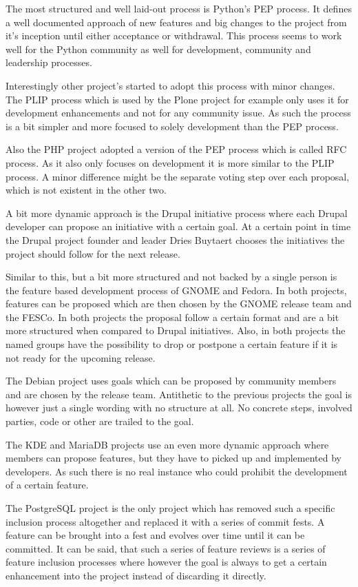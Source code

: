 The most structured and well laid-out process is Python's \ac{PEP} process. It
defines a well documented approach of new features and big changes to the
project from it's inception until either acceptance or withdrawal. This process
seems to work well for the Python community as well for development, community
and leadership processes.

Interestingly other project's started to adopt this process with minor changes.
The \ac{PLIP} process which is used by the Plone project for example only uses
it for development enhancements and not for any community issue. As such the
process is a bit simpler and more focused to solely development than the
\ac{PEP} process. 

Also the PHP project adopted a version of the \ac{PEP} process which is called
\ac{RFC} process. As it also only focuses on development it is more similar to
the \ac{PLIP} process. A minor difference might be the separate voting step
over each proposal, which is not existent in the other two.

A bit more dynamic approach is the Drupal initiative process where each Drupal
developer can propose an initiative with a certain goal. At a certain point in
time the Drupal project founder and leader Dries Buytaert chooses the
initiatives the project should follow for the next release.

Similar to this, but a bit more structured and not backed by a single person is
the feature based development process of GNOME and Fedora. In both projects,
features can be proposed which are then chosen by the GNOME release team and
the \ac{FESCo}. In both projects the proposal follow a certain format and are a
bit more structured when compared to Drupal initiatives. Also, in both projects
the named groups have the possibility to drop or postpone a certain feature if
it is not ready for the upcoming release.

The Debian project uses goals which can be proposed by community members and
are chosen by the release team. Antithetic to the previous projects the goal is
however just a single wording with no structure at all. No concrete steps,
involved parties, code or other are trailed to the goal.

The KDE and MariaDB projects use an even more dynamic approach where members
can propose features, but they have to picked up and implemented by developers.
As such there is no real instance who could prohibit the development of a
certain feature.

The PostgreSQL project is the only project which has removed such a specific
inclusion process altogether and replaced it with a series of commit fests. A
feature can be brought into a fest and evolves over time until it can be
committed. It can be said, that such a series of feature reviews is a series of
feature inclusion processes where however the goal is always to get a certain
enhancement into the project instead of discarding it directly.



